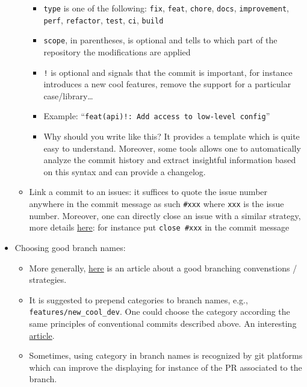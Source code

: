 \documentclass[a4paper,12pt,%
              final%
              ]{article}
\begin{document}
\begin{itemize}
\begin{itemize}
        \begin{itemize}
          \item \texttt{type} is one of the following: \texttt{fix}, \texttt{feat}, \texttt{chore}, \texttt{docs}, \texttt{improvement}, \texttt{perf}, \texttt{refactor}, \texttt{test}, \texttt{ci}, \texttt{build}
          \item \texttt{scope}, in parentheses, is optional and tells to which part of the repository the modifications are applied
          \item \texttt{!} is optional and signals that the commit is important, for instance introduces a new cool features, remove the support for a particular case/library\ldots
          \item Example: ``\texttt{feat(api)!: Add access to low-level config}''
          \item Why should you write like this? It provides a template which is quite easy to understand. Moreover, some tools allows one to automatically analyze the commit history and extract insightful information based on this syntax and can provide a changelog.
        \end{itemize}
      \item Link a commit to an issues: it suffices to quote the issue number anywhere in the commit message as such \verb|#xxx| where \texttt{xxx} is the issue number. Moreover, one can directly close an issue with a similar strategy, more details \href{https://docs.github.com/en/issues/tracking-your-work-with-issues/linking-a-pull-request-to-an-issue}{here}: for instance put \verb|close #xxx| in the commit message
    \end{itemize}
  \item Choosing good branch names:
    \begin{itemize}
      \item More generally, \href{https://nvie.com/posts/a-successful-git-branching-model/}{here} is an article about a good branching convenstions / strategies.
      \item It is suggested to prepend categories to branch names, e.g., \verb|features/new_cool_dev|. One could choose the category according the same principles of conventional commits described above. An interesting \href{https://dev.to/varbsan/a-simplified-convention-for-naming-branches-and-commits-in-git-il4}{article}.
      \item Sometimes, using category in branch names is recognized by git platforms which can improve the displaying for instance of the PR associated to the branch.

\end{itemize}
\end{itemize}
\end{document}

